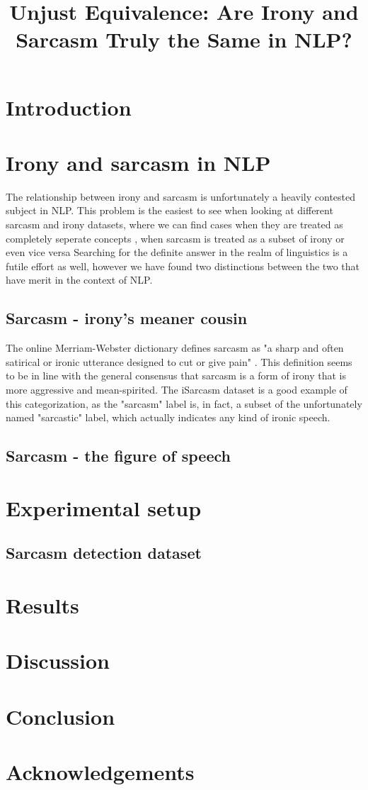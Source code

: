 \documentclass[10pt, a4paper]{article}
\title{Unjust Equivalence: Are Irony and Sarcasm Truly the Same in NLP?}
\begin{document}
\maketitleabstract

\section{Introduction}

\section{Irony and sarcasm in NLP}
The relationship between irony and sarcasm is unfortunately a heavily contested subject in NLP. This problem is the easiest to see when looking at different sarcasm and irony datasets, where
we can find cases when they are treated as completely seperate concepts \citep{kaggle-tweets}, when sarcasm is treated as a subset of irony \citep{semeval-2018} or even vice versa \citep{iSarcasm}
Searching for the definite answer in the realm of linguistics is a futile effort as well, however we have found two distinctions between the two that have merit in the context of NLP.

\subsection{Sarcasm - irony's meaner cousin}
The online Merriam-Webster dictionary defines sarcasm as "a sharp and often satirical or ironic utterance designed to cut or give pain" \citep{mw-dictionary}. This definition seems to be in line
with the general consensus that sarcasm is a form of irony that is more aggressive and mean-spirited. The iSarcasm dataset \citep{iSarcasm} is a good example of this categorization, as the "sarcasm"
label is, in fact, a subset of the unfortunately named "sarcastic" label, which actually indicates any kind of ironic speech.

\subsection{Sarcasm - the figure of speech}

\section{Experimental setup}
\subsection{Sarcasm detection dataset}
\citep{iSarcasm}
\section{Results}

\section{Discussion}

\section{Conclusion}

\section*{Acknowledgements}


 
\end{document}
